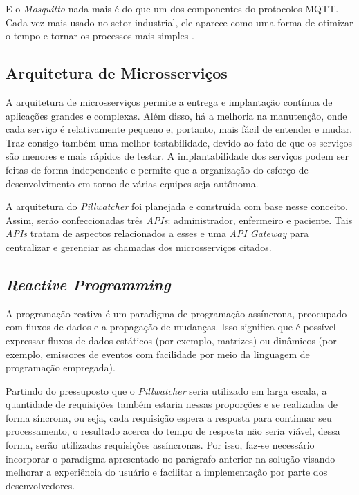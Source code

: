 E o \textit{Mosquitto} nada mais é do que um dos componentes do protocolos MQTT. Cada vez mais usado no setor industrial, ele aparece como uma forma de otimizar o tempo e tornar os processos mais simples \cite{ENGPROCESS_2018}.

\subsection {Arquitetura de Microsserviços}
A arquitetura de microsserviços permite a entrega e implantação contínua de aplicações grandes e complexas. Além disso, há a melhoria na manutenção, onde cada serviço é relativamente pequeno e, portanto, mais fácil de entender e mudar. Traz consigo também uma melhor testabilidade, devido ao fato de que os serviços são menores e mais rápidos de testar. A implantabilidade dos serviços podem ser feitas de forma independente e permite que a organização do esforço de desenvolvimento em torno de várias equipes seja autônoma.

A arquitetura do \textit{Pillwatcher} foi planejada e construída com base nesse conceito. Assim, serão confeccionadas três \textit{APIs}: administrador, enfermeiro e paciente. Tais \textit{APIs} tratam de aspectos relacionados a esses e uma \textit{API Gateway} para centralizar e gerenciar as chamadas dos microsserviços citados.

\subsection {\textit{Reactive Programming}}
A programação reativa é um paradigma de programação assíncrona, preocupado com fluxos de dados e a propagação de mudanças. Isso significa que é possível expressar fluxos de dados estáticos (por exemplo, matrizes) ou dinâmicos (por exemplo, emissores de eventos com facilidade por meio da  linguagem  de programação empregada).

Partindo do pressuposto que o \textit{Pillwatcher} seria utilizado em larga escala, a quantidade de requisições também estaria nessas proporções e se realizadas de forma síncrona, ou seja, cada requisição espera a resposta para continuar seu processamento, o resultado acerca do tempo de resposta não seria viável, dessa forma, serão utilizadas requisições assíncronas. Por isso, faz-se necessário incorporar o paradigma apresentado no parágrafo anterior na solução visando melhorar a experiência do usuário e facilitar a implementação por parte dos desenvolvedores.